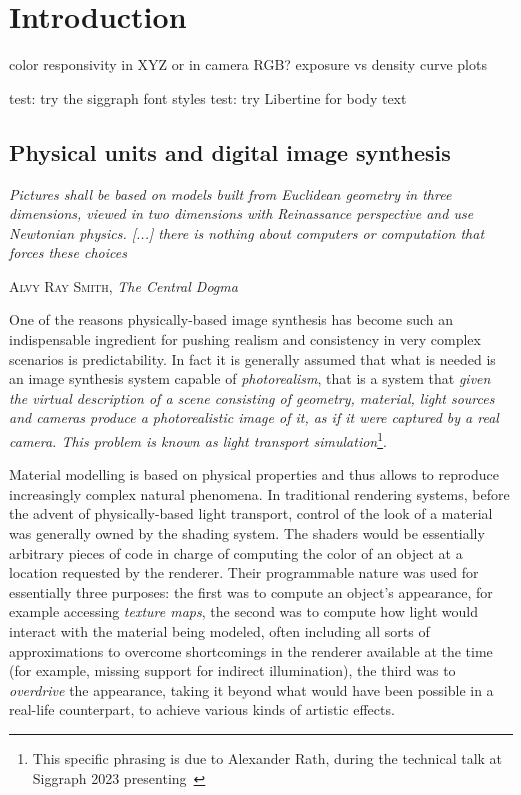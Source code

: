 
\chapter{Introduction}


\ifomit


color responsivity in XYZ or in camera RGB?
exposure vs density curve plots




test: try the siggraph font styles
test: try Libertine for body text

\fi

\section{Physical units and digital image synthesis}
%
\epigraph{%
	\emph{Pictures shall be based on models built from Euclidean geometry
		in three dimensions, viewed in two dimensions with Reinassance perspective
		and use Newtonian physics. [...] 
		there is nothing about computers or computation that forces these choices}}
		{\textsc{Alvy Ray Smith}, \emph{The Central Dogma}}

\noindent One of the reasons physically-based image synthesis has become such an
indispensable ingredient for pushing realism and consistency in very
complex scenarios is predictability. 
In fact it is generally assumed that what is needed is an image synthesis system
capable of \emph{photorealism}, that is a system that \emph{given the virtual 
	description of a scene consisting of geometry, material, light sources and cameras
	produce a photorealistic image of it, as if it were captured by a real camera.
	This problem is known as light transport simulation}\footnote{
	This specific phrasing is due to Alexander Rath, during the technical talk at 
	Siggraph 2023 presenting~\cite{rath23}}.


Material modelling is based on physical properties and thus allows to reproduce 
increasingly complex natural phenomena. 
In traditional rendering systems, before the advent of physically-based light transport, 
control of the look of a material was generally owned by the \gls{shading system}.
The \glspl{shader} would be essentially arbitrary pieces of code in charge of computing
the color of an object at a location requested by the renderer. 
Their programmable nature was used for essentially three purposes:
the first was to compute an object's appearance, for example accessing \emph{texture maps},
the second was to compute how light would interact with the material being modeled, often including
all sorts of approximations to overcome shortcomings in the renderer available at the time 
(for example, missing support for indirect illumination),
the third was to \emph{overdrive} the appearance, taking it beyond what would have been possible in a real-life
counterpart, to achieve various kinds of artistic effects.

